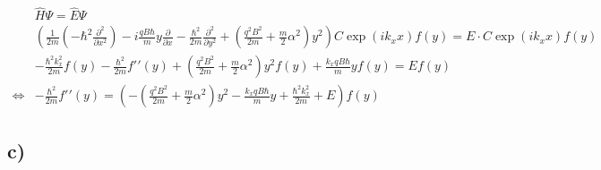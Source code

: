     \begin{align}
        &\hat{H}\Psi = \hat{E}\Psi\\
        &\left( \frac{1}{2m} \left( -\hbar^2 \frac{\partial^2}{\partial x^2} \right) -i \frac{qB\hbar}{m} y \frac{\partial}{\partial x} - \frac{\hbar^2}{2m} \frac{\partial^2}{\partial y^2} + \left( \frac{q^2 B^2}{2m} + \frac{m}{2} \alpha^2 \right) y^2 \right) C\exp\left( ik_x x \right) f(y) = E \cdot C\exp\left( ik_x x \right) f(y)\\
        &-\frac{\hbar^2 k_x^2}{2m} f(y) - \frac{\hbar^2}{2m} f\prime\prime(y) + \left( \frac{q^2 B^2}{2m} + \frac{m}{2} \alpha^2 \right) y^2 f(y) + \frac{k_x q B \hbar}{m} yf(y) = Ef(y)\\
        \Leftrightarrow &-\frac{\hbar^2}{2m} f\prime\prime (y) = \left( - \left( \frac{q^2 B^2}{2m} + \frac{m}{2}\alpha^2 \right) y^2 - \frac{k_x q B \hbar}{m} y + \frac{\hbar^2 k_x^2}{2m} + E \right) f(y)
    \end{align}

\subsection{c)}

